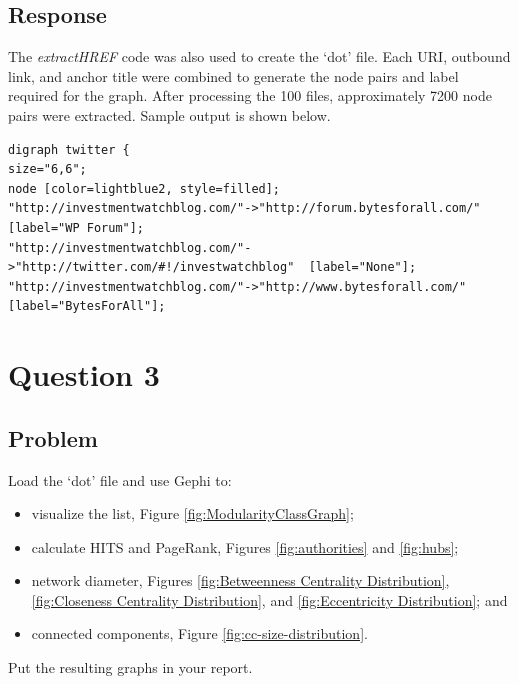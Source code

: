 \documentclass[letterpaper,11pt]{report}
\begin{document}
\begin{savenotes}
\subsection{Response}The \emph{extractHREF} code was also used to create the `dot' file. Each URI, outbound link, and anchor title were combined to generate the node pairs and label required for the graph. After processing the 100 files, approximately 7200 node pairs were extracted. Sample output is shown below.

\begin{verbatim}
digraph twitter { 
size="6,6"; 
node [color=lightblue2, style=filled];
"http://investmentwatchblog.com/"->"http://forum.bytesforall.com/"  [label="WP Forum"];
"http://investmentwatchblog.com/"->"http://twitter.com/#!/investwatchblog"  [label="None"];
"http://investmentwatchblog.com/"->"http://www.bytesforall.com/"  [label="BytesForAll"];
\end{verbatim}

\section{Question 3}
\subsection{Problem}Load the `dot' file and use Gephi to:
\begin{itemize}
	\item visualize the list, Figure \ref{fig:ModularityClassGraph};
	\item calculate HITS and PageRank, Figures \ref{fig:authorities} and \ref{fig:hubs};
	\item network diameter, Figures \ref{fig:Betweenness Centrality Distribution}, \ref{fig:Closeness Centrality Distribution}, and \ref{fig:Eccentricity Distribution}; and
	\item connected components, Figure \ref{fig:cc-size-distribution}.
\end{itemize}
Put the resulting graphs in your report.

\end{savenotes}
\end{document}
